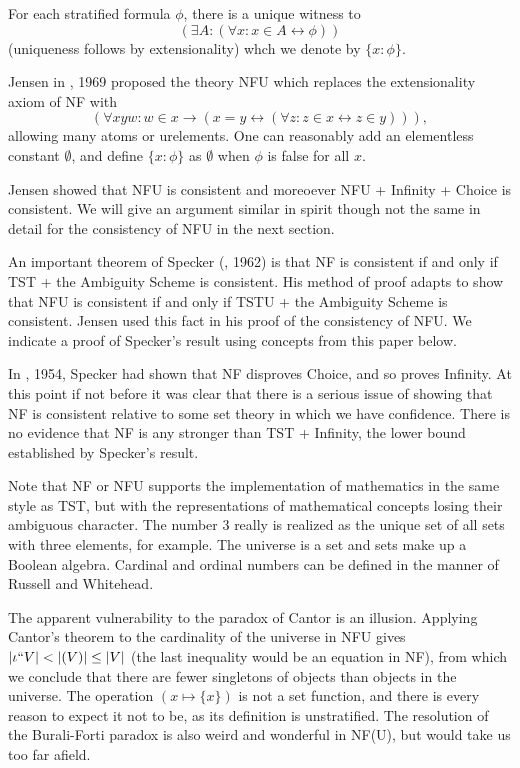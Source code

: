 \documentclass[112pt]{article}
\begin{document}
For each stratified formula $\phi$, there is a unique witness to $$(\exists A:(\forall x:x \in A \leftrightarrow \phi))$$ (uniqueness follows by extensionality) whch we denote by $\{x:\phi\}$.

Jensen in \cite{nfu}, 1969 proposed the theory NFU which replaces the extensionality axiom of NF with $$(\forall xyw:w \in x \rightarrow (x=y \leftrightarrow (\forall z:z \in x \leftrightarrow z\in y))),$$  allowing many atoms or urelements.  One can reasonably add an elementless constant $\emptyset$, and define $\{x:\phi\}$ as $\emptyset$ when $\phi$ is false for all $x$.

Jensen showed that NFU is consistent and moreoever NFU + Infinity + Choice is consistent.  We will give an argument similar in spirit though not the same in detail for the consistency of NFU in the next section.

An important theorem of Specker (\cite{ambiguity}, 1962) is that NF is consistent if and only if TST + the Ambiguity Scheme is consistent.  His method of proof adapts to show that  NFU is consistent if and only if TSTU + the Ambiguity Scheme is consistent.  Jensen used this fact in his proof of the consistency of NFU.  We indicate a proof of Specker's result using concepts from this paper below.

In \cite{notac}, 1954, Specker had shown that NF disproves Choice, and so proves Infinity.  At this point if not before it was clear that there is a serious issue of showing that NF is consistent relative to some set theory in which we have confidence.  There is no evidence that NF is any stronger than TST + Infinity, the lower bound established by Specker's result.

Note that NF or NFU supports the implementation of mathematics in the same style as TST, but with the representations of mathematical concepts losing their ambiguous character.  The number 3 really is realized as the unique set of all sets with three elements, for example.  The universe is a set and sets make up a Boolean algebra.   Cardinal and ordinal numbers can be defined
in the manner of Russell and Whitehead.

The apparent vulnerability to the paradox of Cantor is an illusion.  Applying Cantor's theorem to the cardinality of the universe in NFU gives $|\iota``V| < |{\cal }(V)| \leq |V|$ (the last inequality would be an equation in NF), from which we conclude that there are fewer singletons of objects than objects in the universe.  The operation $(x \mapsto \{x\})$ is not a set function, and there is every reason to expect it not to be, as its definition is unstratified.  The resolution of the Burali-Forti paradox is also weird and wonderful in NF(U), but would take us too far afield.
\end{document}
